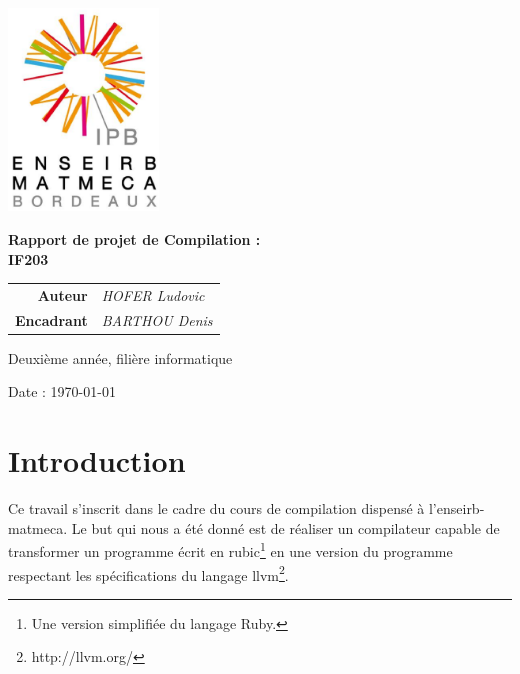\documentclass[12pt]{article}
\begin{document}
\thispagestyle{empty}



\hfill  \includegraphics [width=40mm]{ENSEIRB-MATMECA.ps}


\begin{center}
	\Huge{\textbf{Rapport de projet de Compilation :\\
      \vspace{1cm}
      IF203}}
\end{center}


\begin{tabular}{r@{:~}l}
	\textbf{Auteur} & \textit{HOFER Ludovic}\\
  \textbf{Encadrant} & \textit{BARTHOU Denis}\\
\end{tabular}


\begin{center}Deuxième année, filière informatique

	Date : \today
\end{center}

\newpage

\section{Introduction}
Ce travail s'inscrit dans le cadre du cours de compilation dispensé à
l'enseirb-matmeca. Le but qui nous a été donné est de réaliser un compilateur
capable de transformer un programme écrit en rubic\footnote{Une version
simplifiée du langage Ruby.} en une version du programme respectant les
spécifications du langage llvm\footnote{http://llvm.org/}.\\
\end{document}
